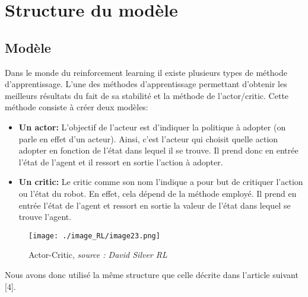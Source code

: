 \section{Structure du modèle}
\subsection{Modèle}
Dans le monde du reinforcement learning il existe plusieurs types de méthode d’apprentissage. L’une des méthodes d’apprentissage permettant d’obtenir les meilleurs résultats du fait de sa stabilité et la méthode de l’actor/critic.
Cette méthode consiste à créer deux modèles:

\begin{itemize}
    \item \textbf{Un actor:} 
    L’objectif de l'acteur est d’indiquer la politique à adopter (on parle en effet d’un acteur).
    Ainsi, c’est l’acteur qui choisit quelle action adopter en fonction de l’état dans lequel il se trouve.
    Il prend donc en entrée l’état de l’agent et il ressort en sortie l’action à adopter.
    
    \item \textbf{Un critic:} 
    Le critic comme son nom l’indique a pour but de critiquer l’action ou l’état du robot.
    En effet, cela dépend de la méthode employé.
    Il prend en entrée l’état de l’agent et ressort en sortie la valeur de l’état dans lequel se trouve l’agent.
\end{itemize}

\begin{figure}[H]
    \centering
    \texttt{[image: ./image\_RL/image23.png]}
    \caption{Actor-Critic, \textit{source : David Silver RL}}
\end{figure}

Nous avons donc utilisé la même structure que celle décrite dans l’article suivant [4].
